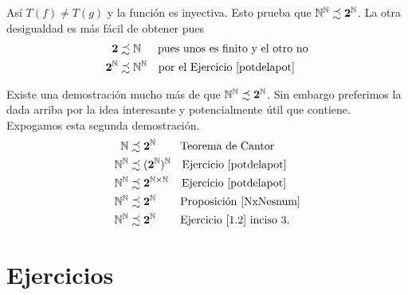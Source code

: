 \begin{demo}
Así $T(f)\neq T(g)$ y la función es inyectiva. Esto prueba
que $\mathbb{N}^{\mathbb{N}}\precsim \mathbf{2}^{\mathbb{N}}$. La otra desigualdad es
más fácil de obtener pues
\[
  \begin{split}
      \mathbf{2}&\precsim \mathbb{N}\quad\,\,\, \text{pues unos es finito y el
      otro no}\\
      \mathbf{2}^{\mathbb{N}}&\precsim\mathbb{N}^{\mathbb{N}}\quad \text{por el
      Ejercicio \ref{potdelapot} }
  \end{split}
\]
\end{demo}

Existe una demostración mucho más  de que
$\mathbb{N}^{\mathbb{N}}\precsim\mathbf{2}^{\mathbb{N}}$. Sin embargo preferimos la dada arriba por la idea interesante y potencialmente útil que contiene.  Expogamos esta segunda demostración.
\[
  \begin{split}
       \mathbb{N} &\precsim \mathbf{2}^{\mathbb{N}}\quad\quad\,\text{Teorema de
       Cantor}\\
       \mathbb{N}^{\mathbb{N}} &\precsim (\mathbf{2}^{\mathbb{N}})^{\mathbb{N}}\quad\text{Ejercicio
       \ref{potdelapot}}\\
        \mathbb{N}^{\mathbb{N}} &\precsim \mathbf{2}^{\mathbb{N}\times\mathbb{N}}\quad\,\text{Ejercicio
       \ref{potdelapot}}\\
        \mathbb{N}^{\mathbb{N}} &\precsim \mathbf{2}^{\mathbb{N}}\quad\quad\,\text{Proposición  \ref{NxNesnum}}\\
        \mathbb{N}^{\mathbb{N}} &\precsim \mathbf{2}^{\mathbb{N}}\quad\quad\,\text{Ejercicio
       \ref{1.2} inciso 3}.
  \end{split}
\]


\section{Ejercicios}


